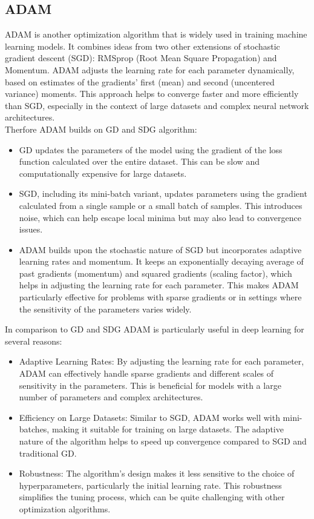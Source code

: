 \documentclass[journal]{IEEEtran}
\begin{document}
\subsection{ADAM}
ADAM is another optimization algorithm that is widely used in training machine learning models. It combines ideas from two other extensions of stochastic gradient descent (SGD): RMSprop (Root Mean Square Propagation) and Momentum. ADAM adjusts the learning rate for each parameter dynamically, based on estimates of the gradients' first (mean) and second (uncentered variance) moments. This approach helps to converge faster and more efficiently than SGD, especially in the context of large datasets and complex neural network architectures.\\
Therfore ADAM builds on GD and SDG algorithm:
\begin{itemize}
    \item GD updates the parameters of the model using the gradient of the loss function calculated over the entire dataset. This can be slow and computationally expensive for large datasets.
    \item SGD, including its mini-batch variant, updates parameters using the gradient calculated from a single sample or a small batch of samples. This introduces noise, which can help escape local minima but may also lead to convergence issues.
    \item ADAM builds upon the stochastic nature of SGD but incorporates adaptive learning rates and momentum. It keeps an exponentially decaying average of past gradients (momentum) and squared gradients (scaling factor), which helps in adjusting the learning rate for each parameter. This makes ADAM particularly effective for problems with sparse gradients or in settings where the sensitivity of the parameters varies widely.
\end{itemize}
 In comparison to GD and SDG ADAM is particularly useful in deep learning for several reasons:
\begin{itemize}
    \item Adaptive Learning Rates: By adjusting the learning rate for each parameter, ADAM can effectively handle sparse gradients and different scales of sensitivity in the parameters. This is beneficial for models with a large number of parameters and complex architectures.
    \item Efficiency on Large Datasets: Similar to SGD, ADAM works well with mini-batches, making it suitable for training on large datasets. The adaptive nature of the algorithm helps to speed up convergence compared to SGD and traditional GD.
    \item Robustness: The algorithm's design makes it less sensitive to the choice of hyperparameters, particularly the initial learning rate. This robustness simplifies the tuning process, which can be quite challenging with other optimization algorithms.
\end{itemize}
\end{document}
